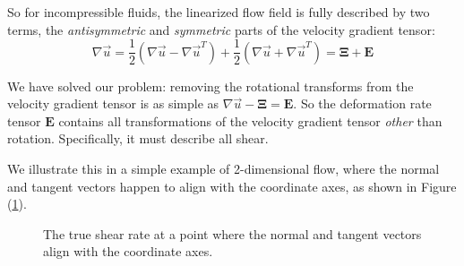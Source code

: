 \documentclass[12pt, a4paper, twoside, openright]{book}
\begin{document}
So for incompressible fluids, the linearized flow field is fully described by two terms, the \emph{antisymmetric} and \emph{symmetric} parts of the velocity gradient tensor:
\begin{equation}
\nabla \vec{u} =
\frac{1}{2}(\nabla \vec{u} - \nabla \vec{u}^T) +
\frac{1}{2}(\nabla \vec{u} + \nabla \vec{u}^T) 
 = \mathbf{\Xi} + \mathbf{E}
\end{equation}

We have solved our problem: removing the rotational transforms from the velocity gradient tensor is as simple as $\nabla \vec{u} - \mathbf{\Xi} = \mathbf{E}$.  So the deformation rate tensor $\mathbf{E}$ contains all transformations of the velocity gradient tensor \emph{other} than rotation.  Specifically, it must describe all shear.

We illustrate this in a simple example of 2-dimensional flow, where the normal and tangent vectors happen to align with the coordinate axes, as shown in Figure (\ref{shearrate}).

\begin{figure}[ht]
\centering
{}
\caption{The true shear rate at a point where the normal and tangent vectors align with the coordinate axes.}\label{shearrate}
\end{figure}
\end{document}
